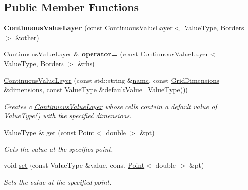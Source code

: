 \subsection*{Public Member Functions}
\begin{DoxyCompactItemize}
\item 
\hypertarget{classrepast_1_1_continuous_value_layer_a89bd9bd46e0bc1b10f1106a88298bdbd}{{\bfseries Continuous\-Value\-Layer} (const \hyperlink{classrepast_1_1_continuous_value_layer}{Continuous\-Value\-Layer}$<$ Value\-Type, \hyperlink{classrepast_1_1_borders}{Borders} $>$ \&other)}\label{classrepast_1_1_continuous_value_layer_a89bd9bd46e0bc1b10f1106a88298bdbd}

\item 
\hypertarget{classrepast_1_1_continuous_value_layer_ae302163efacfefd43908f9ca37574010}{\hyperlink{classrepast_1_1_continuous_value_layer}{Continuous\-Value\-Layer} \& {\bfseries operator=} (const \hyperlink{classrepast_1_1_continuous_value_layer}{Continuous\-Value\-Layer}$<$ Value\-Type, \hyperlink{classrepast_1_1_borders}{Borders} $>$ \&rhs)}\label{classrepast_1_1_continuous_value_layer_ae302163efacfefd43908f9ca37574010}

\item 
\hyperlink{classrepast_1_1_continuous_value_layer_ab5c3df3bdca7ef3b87150f9be3dfc2fe}{Continuous\-Value\-Layer} (const std\-::string \&\hyperlink{classrepast_1_1_base_value_layer_a27277765ee50f9d5446b253f77797f5c}{name}, const \hyperlink{classrepast_1_1_grid_dimensions}{Grid\-Dimensions} \&\hyperlink{classrepast_1_1_value_layer_a51fe7fe718305d0c006bc465a14ef0e3}{dimensions}, const Value\-Type \&default\-Value=Value\-Type())
\begin{DoxyCompactList}\small\item\em Creates a \hyperlink{classrepast_1_1_continuous_value_layer}{Continuous\-Value\-Layer} whose cells contain a default value of Value\-Type() with the specified dimensions. \end{DoxyCompactList}\item 
Value\-Type \& \hyperlink{classrepast_1_1_continuous_value_layer_a020830982b41af4f1d955eee5b617bfa}{get} (const \hyperlink{classrepast_1_1_point}{Point}$<$ double $>$ \&pt)
\begin{DoxyCompactList}\small\item\em Gets the value at the specified point. \end{DoxyCompactList}\item 
void \hyperlink{classrepast_1_1_continuous_value_layer_a619f04cc04200c8de6616ec971674289}{set} (const Value\-Type \&value, const \hyperlink{classrepast_1_1_point}{Point}$<$ double $>$ \&pt)
\begin{DoxyCompactList}\small\item\em Sets the value at the specified point. \end{DoxyCompactList}\end{DoxyCompactItemize}


